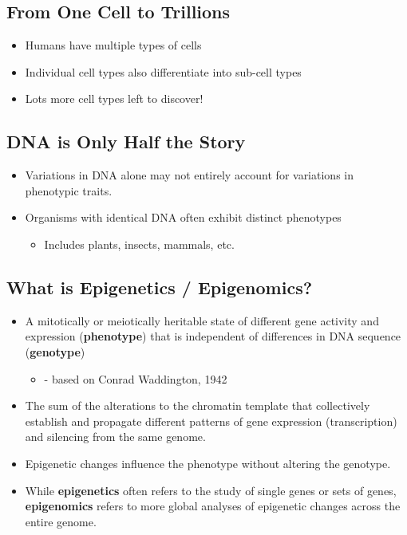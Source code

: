 \documentclass[10pt]{article}
\begin{document}
\subsection*{From One Cell to Trillions}
\begin{itemize}
	\item Humans have multiple types of cells
	\item Individual cell types also differentiate into sub-cell types
	\item Lots more cell types left to discover!
\end{itemize}

\subsection*{DNA is Only Half the Story}
\begin{itemize}
	\item Variations in DNA alone may not entirely account for variations in phenotypic traits.
	\item Organisms with identical DNA often exhibit distinct phenotypes
	\begin{itemize}
	    \item Includes plants, insects, mammals, etc.
    \end{itemize}
\end{itemize}

\subsection*{What is Epigenetics / Epigenomics?}
\begin{itemize}
	\item A mitotically or meiotically heritable state of different gene activity and expression (\textbf{phenotype}) that is independent of differences in DNA sequence (\textbf{genotype})
	\begin{itemize}
	    \item - based on Conrad Waddington, 1942
    \end{itemize}
	\item The sum of the alterations to the chromatin template that collectively establish and propagate different patterns of gene expression (transcription) and silencing from the same genome.
    \item Epigenetic changes influence the phenotype without altering the genotype.
    \item While \textbf{epigenetics} often refers to the study of single genes or sets of genes, \textbf{epigenomics} refers to more global analyses of epigenetic changes across the entire genome.
\end{itemize}
\end{document}
